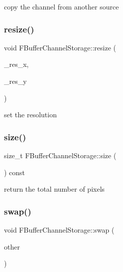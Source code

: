 copy the channel from another source \mbox{\label{struct_f_buffer_channel_storage_a183964cd1e00171df5eb4c2130db6c44}} 
\subsubsection{\texorpdfstring{resize()}{resize()}}
{\footnotesize\ttfamily void F\+Buffer\+Channel\+Storage\+::resize (\begin{DoxyParamCaption}\item[{const uint32\+\_\+t}]{\+\_\+res\+\_\+x,  }\item[{const uint32\+\_\+t}]{\+\_\+res\+\_\+y }\end{DoxyParamCaption})\hspace{0.3cm}{\ttfamily [inline]}}

set the resolution \mbox{\label{struct_f_buffer_channel_storage_ace7afe67f49b4a628653dd42a5e39147}} 
\subsubsection{\texorpdfstring{size()}{size()}}
{\footnotesize\ttfamily size\+\_\+t F\+Buffer\+Channel\+Storage\+::size (\begin{DoxyParamCaption}{ }\end{DoxyParamCaption}) const\hspace{0.3cm}{\ttfamily [inline]}}

return the total number of pixels \mbox{\label{struct_f_buffer_channel_storage_adff7d04a3c7da747d662403c930c4074}} 
\subsubsection{\texorpdfstring{swap()}{swap()}}
{\footnotesize\ttfamily void F\+Buffer\+Channel\+Storage\+::swap (\begin{DoxyParamCaption}\item[{\hyperlink{struct_f_buffer_channel_storage}{F\+Buffer\+Channel\+Storage} \&}]{other }\end{DoxyParamCaption})\hspace{0.3cm}{\ttfamily [inline]}}

